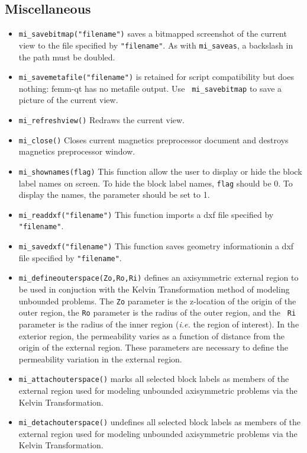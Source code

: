 \subsection{Miscellaneous}
\begin{itemize}
\item{\tt mi\_savebitmap("filename")} saves a bitmapped screenshot of the current
view to the file specified by {\tt "filename"}.  As with {\tt mi\_saveas},
a backslash in the path must be doubled.
\item{\tt mi\_savemetafile("filename")} is retained for script
compatibility but does nothing: femm-qt has no metafile output.  Use {\tt
mi\_savebitmap} to save a picture of the current view.
\item{\tt mi\_refreshview()} Redraws the current view.
\item{\tt mi\_close()} Closes current magnetics preprocessor
document and destroys magnetics preprocessor window.
\item{\tt mi\_shownames(flag)} This function allow the user to display or hide the block label
names on screen.  To hide the block label names, {\tt flag} should be 0.  To display the
names, the parameter should be set to 1.
\item{\tt mi\_readdxf("filename")} This function imports a dxf file specified by {\tt "filename"}.
\item{\tt mi\_savedxf("filename")} This function saves geometry informationin a dxf file specified by {\tt "filename"}.
\item{\tt mi\_defineouterspace(Zo,Ro,Ri)} defines
an axisymmetric external region to be used in conjuction with the
Kelvin Transformation method of modeling unbounded problems.  The
{\tt Zo} parameter is the z-location of the origin of the outer region,
the {\tt Ro} parameter is the radius of the outer region, and the {\tt
Ri} parameter is the radius of the inner region ({\em i.e.} the region of
interest). In the exterior region, the permeability varies as a function of
distance from the origin of the external region.  These parameters
are necessary to define the permeability variation in the external
region.
\item{\tt mi\_attachouterspace()} marks all
selected block labels as members of the external region used for
modeling unbounded axisymmetric problems via the Kelvin
Transformation.
\item{\tt mi\_detachouterspace()} undefines all selected block labels
as members of the external region used for modeling unbounded axisymmetric
problems via the Kelvin Transformation.


\end{itemize}

